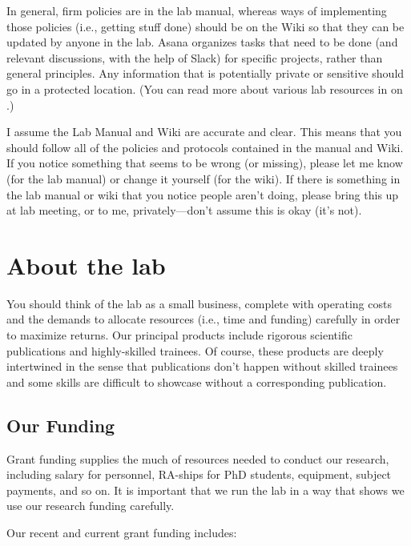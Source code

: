 \documentclass[letterpaper,12pt,oneside]{memoir}
\begin{document}
In general, firm policies are in the lab manual, whereas ways of implementing those policies (i.e., getting stuff done) should be on the Wiki so that they can be updated by anyone in the lab. Asana organizes tasks that need to be done (and relevant discussions, with the help of Slack) for specific projects, rather than general principles. Any information that is potentially private or sensitive should go in a protected location. (You can read more about various lab resources in  on .)

\begin{shaded}
\noindent I assume the Lab Manual and Wiki are accurate and clear. This means that you should follow all of the policies and protocols contained in the manual and Wiki. If you notice something that seems to be wrong (or missing), please let me know (for the lab manual) or change it yourself (for the wiki). If there is something in the lab manual or wiki that you notice people aren't doing, please bring this up at lab meeting, or to me, privately---don't assume this is okay (it's not).
\end{shaded}


\chapter{About the lab} 

You should think of the lab as a small business, complete with operating costs and the demands to allocate resources (i.e., time and funding) carefully in order to maximize returns. Our principal products include rigorous scientific publications and highly-skilled trainees. Of course, these products are deeply intertwined in the sense that publications don't happen without skilled trainees and some skills are difficult to showcase without a corresponding publication.

\section{Our Funding}

Grant funding supplies the much of resources needed to conduct our research, including salary for personnel, RA-ships for PhD students, equipment, subject payments, and so on. It is important that we run the lab in a way that shows we use our research funding carefully. 

Our recent and current grant funding includes:
\end{document}
